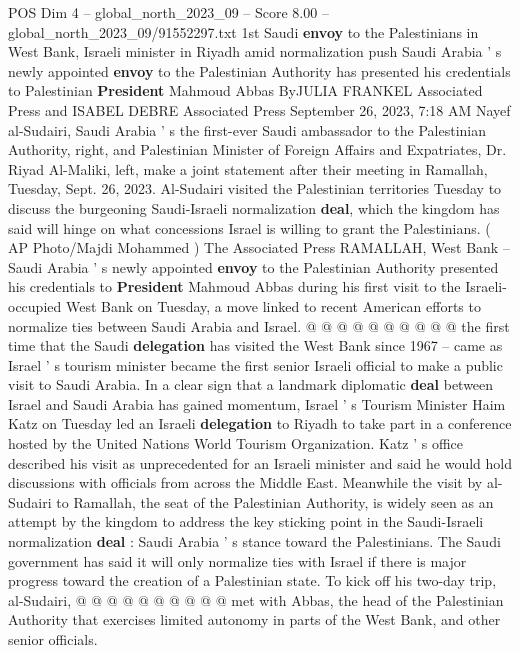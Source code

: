 \begin{textsample}{POS Dim 4 – global\_north\_2023\_09 – Score 8.00 – global\_north\_2023\_09/91552297.txt}  \label{ex:f4_pos_412}
1st Saudi \textbf{envoy} to the Palestinians in West Bank, Israeli minister in Riyadh amid normalization push Saudi Arabia ' s newly appointed \textbf{envoy} to the Palestinian Authority has presented his credentials to Palestinian \textbf{President} Mahmoud Abbas ByJULIA FRANKEL Associated Press and ISABEL DEBRE Associated Press September 26, 2023, 7:18 AM Nayef al-Sudairi, Saudi Arabia ' s the first-ever Saudi ambassador to the Palestinian Authority, right, and Palestinian Minister of Foreign Affairs and Expatriates, Dr.
Riyad Al-Maliki, left, make a joint statement after their meeting in Ramallah, Tuesday, Sept. 26, 2023.
Al-Sudairi visited the Palestinian territories Tuesday to discuss the burgeoning Saudi-Israeli normalization \textbf{deal}, which the kingdom has said will hinge on what concessions Israel is willing to grant the Palestinians. ( AP Photo/Majdi Mohammed ) The Associated Press RAMALLAH, West Bank -- Saudi Arabia ' s newly appointed \textbf{envoy} to the Palestinian Authority presented his credentials to \textbf{President} Mahmoud Abbas during his first visit to the Israeli-occupied West Bank on Tuesday, a move linked to recent American efforts to normalize ties between Saudi Arabia and Israel. @ @ @ @ @ @ @ @ @ @ the first time that the Saudi \textbf{delegation} has visited the West Bank since 1967 -- came as Israel ' s tourism minister became the first senior Israeli official to make a public visit to Saudi Arabia.
In a clear sign that a landmark diplomatic \textbf{deal} between Israel and Saudi Arabia has gained momentum, Israel ' s Tourism Minister Haim Katz on Tuesday led an Israeli \textbf{delegation} to Riyadh to take part in a conference hosted by the United Nations World Tourism Organization.
Katz ' s office described his visit as unprecedented for an Israeli minister and said he would hold discussions with officials from across the Middle East.
Meanwhile the visit by al-Sudairi to Ramallah, the seat of the Palestinian Authority, is widely seen as an attempt by the kingdom to address the key sticking point in the Saudi-Israeli normalization \textbf{deal} : Saudi Arabia ' s stance toward the Palestinians.
The Saudi government has said it will only normalize ties with Israel if there is major progress toward the creation of a Palestinian state.
To kick off his two-day trip, al-Sudairi, @ @ @ @ @ @ @ @ @ @ met with Abbas, the head of the Palestinian Authority that exercises limited autonomy in parts of the West Bank, and other senior officials.

\end{textsample}
